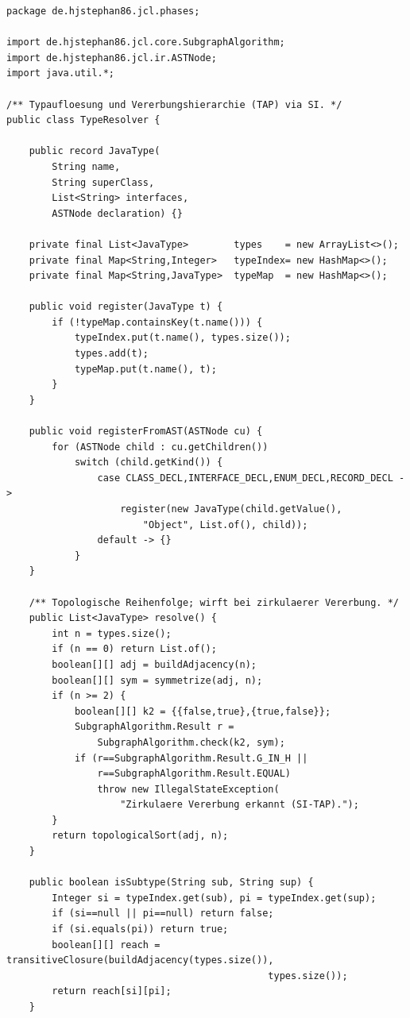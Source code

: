 ﻿\documentclass[a4paper,12pt]{article}
\theoremstyle{definition}
\begin{document}
\begin{lstlisting}[style=javastyle,
    caption={TypeResolver.java -- TAP via SI}]
package de.hjstephan86.jcl.phases;

import de.hjstephan86.jcl.core.SubgraphAlgorithm;
import de.hjstephan86.jcl.ir.ASTNode;
import java.util.*;

/** Typaufloesung und Vererbungshierarchie (TAP) via SI. */
public class TypeResolver {

    public record JavaType(
        String name,
        String superClass,
        List<String> interfaces,
        ASTNode declaration) {}

    private final List<JavaType>        types    = new ArrayList<>();
    private final Map<String,Integer>   typeIndex= new HashMap<>();
    private final Map<String,JavaType>  typeMap  = new HashMap<>();

    public void register(JavaType t) {
        if (!typeMap.containsKey(t.name())) {
            typeIndex.put(t.name(), types.size());
            types.add(t);
            typeMap.put(t.name(), t);
        }
    }

    public void registerFromAST(ASTNode cu) {
        for (ASTNode child : cu.getChildren())
            switch (child.getKind()) {
                case CLASS_DECL,INTERFACE_DECL,ENUM_DECL,RECORD_DECL ->
                    register(new JavaType(child.getValue(),
                        "Object", List.of(), child));
                default -> {}
            }
    }

    /** Topologische Reihenfolge; wirft bei zirkulaerer Vererbung. */
    public List<JavaType> resolve() {
        int n = types.size();
        if (n == 0) return List.of();
        boolean[][] adj = buildAdjacency(n);
        boolean[][] sym = symmetrize(adj, n);
        if (n >= 2) {
            boolean[][] k2 = {{false,true},{true,false}};
            SubgraphAlgorithm.Result r =
                SubgraphAlgorithm.check(k2, sym);
            if (r==SubgraphAlgorithm.Result.G_IN_H ||
                r==SubgraphAlgorithm.Result.EQUAL)
                throw new IllegalStateException(
                    "Zirkulaere Vererbung erkannt (SI-TAP).");
        }
        return topologicalSort(adj, n);
    }

    public boolean isSubtype(String sub, String sup) {
        Integer si = typeIndex.get(sub), pi = typeIndex.get(sup);
        if (si==null || pi==null) return false;
        if (si.equals(pi)) return true;
        boolean[][] reach = transitiveClosure(buildAdjacency(types.size()),
                                              types.size());
        return reach[si][pi];
    }


\end{lstlisting}
\end{document}
